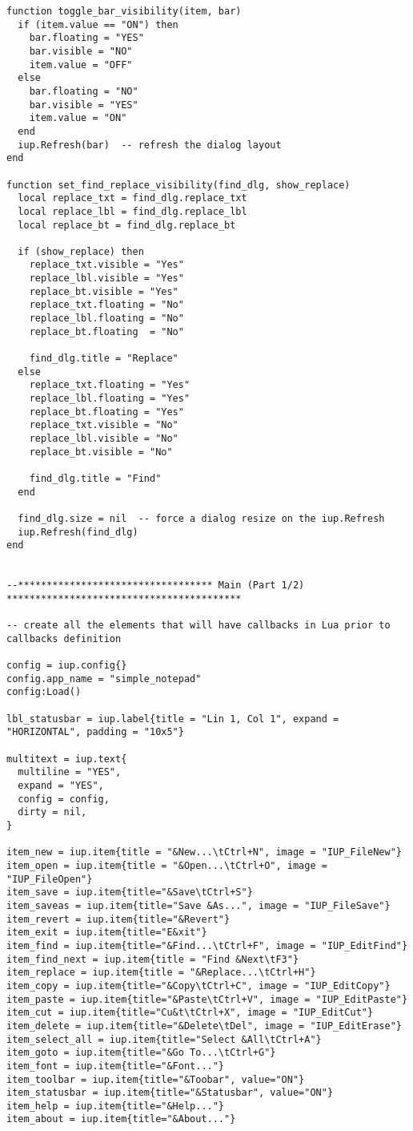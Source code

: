 \documentclass{ctexart}
\begin{document}
\begin{lstlisting}
function toggle_bar_visibility(item, bar)
  if (item.value == "ON") then
    bar.floating = "YES"
    bar.visible = "NO"
    item.value = "OFF"
  else
    bar.floating = "NO"
    bar.visible = "YES"
    item.value = "ON"
  end
  iup.Refresh(bar)  -- refresh the dialog layout
end

function set_find_replace_visibility(find_dlg, show_replace)
  local replace_txt = find_dlg.replace_txt
  local replace_lbl = find_dlg.replace_lbl
  local replace_bt = find_dlg.replace_bt

  if (show_replace) then
    replace_txt.visible = "Yes"
    replace_lbl.visible = "Yes"
    replace_bt.visible = "Yes"
    replace_txt.floating = "No"
    replace_lbl.floating = "No"
    replace_bt.floating  = "No"

    find_dlg.title = "Replace"
  else
    replace_txt.floating = "Yes"
    replace_lbl.floating = "Yes"
    replace_bt.floating = "Yes"
    replace_txt.visible = "No"
    replace_lbl.visible = "No"
    replace_bt.visible = "No"

    find_dlg.title = "Find"
  end

  find_dlg.size = nil  -- force a dialog resize on the iup.Refresh
  iup.Refresh(find_dlg)
end


--********************************** Main (Part 1/2) *****************************************

-- create all the elements that will have callbacks in Lua prior to callbacks definition

config = iup.config{}
config.app_name = "simple_notepad"
config:Load()

lbl_statusbar = iup.label{title = "Lin 1, Col 1", expand = "HORIZONTAL", padding = "10x5"}

multitext = iup.text{
  multiline = "YES",
  expand = "YES",
  config = config,
  dirty = nil,
}

item_new = iup.item{title = "&New...\tCtrl+N", image = "IUP_FileNew"}
item_open = iup.item{title = "&Open...\tCtrl+O", image = "IUP_FileOpen"}
item_save = iup.item{title="&Save\tCtrl+S"}
item_saveas = iup.item{title="Save &As...", image = "IUP_FileSave"}
item_revert = iup.item{title="&Revert"}
item_exit = iup.item{title="E&xit"}
item_find = iup.item{title="&Find...\tCtrl+F", image = "IUP_EditFind"}
item_find_next = iup.item{title = "Find &Next\tF3"}
item_replace = iup.item{title = "&Replace...\tCtrl+H"}
item_copy = iup.item{title="&Copy\tCtrl+C", image = "IUP_EditCopy"}
item_paste = iup.item{title="&Paste\tCtrl+V", image = "IUP_EditPaste"}
item_cut = iup.item{title="Cu&t\tCtrl+X", image = "IUP_EditCut"}
item_delete = iup.item{title="&Delete\tDel", image = "IUP_EditErase"}
item_select_all = iup.item{title="Select &All\tCtrl+A"}
item_goto = iup.item{title="&Go To...\tCtrl+G"}
item_font = iup.item{title="&Font..."}
item_toolbar = iup.item{title="&Toobar", value="ON"}
item_statusbar = iup.item{title="&Statusbar", value="ON"}
item_help = iup.item{title="&Help..."}
item_about = iup.item{title="&About..."}


\end{lstlisting}
\end{document}
